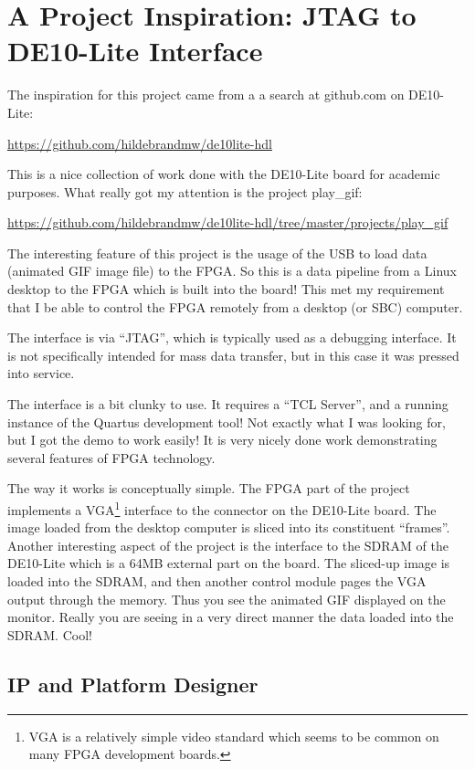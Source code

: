 \section{A Project Inspiration: JTAG to DE10-Lite Interface}

The inspiration for this project came from a a search at github.com on DE10-Lite:

\url{https://github.com/hildebrandmw/de10lite-hdl}

This is a nice collection of work done with the DE10-Lite board for academic purposes.
What really got my attention is the project play\_gif:

\url{https://github.com/hildebrandmw/de10lite-hdl/tree/master/projects/play_gif}

The interesting feature of this project is the usage of the USB to load data (animated GIF image file)
to the FPGA.  So this is a data pipeline from a Linux desktop to the FPGA which is built into the board!
This met my requirement that I be able to control the FPGA remotely from a desktop (or SBC) computer.

The interface is via ``JTAG'', which is typically used as a debugging interface.  It is not specifically intended for mass data transfer, but in this case it was pressed into service.

The interface is a bit clunky to use.  It requires a ``TCL Server'', and a running instance of the Quartus development tool!  Not exactly what I was looking for, but I got the demo to work easily!  It is very nicely done work demonstrating several features of FPGA technology.

The way it works is conceptually simple.  The FPGA part of the project implements a VGA\footnote{VGA is a relatively simple video standard which seems to be common on many FPGA development boards.} interface to the connector on the DE10-Lite board.  The image loaded from the desktop computer is sliced into its constituent ``frames''.
Another interesting aspect of the project is the interface to the SDRAM of the DE10-Lite which is a 64MB external part on the board.  The sliced-up image is loaded into the SDRAM, and then another control module pages the VGA output through the memory.  Thus you see the animated GIF displayed on the monitor.  Really you are seeing in a very direct manner the data loaded into the SDRAM.  Cool!

\subsection{IP and Platform Designer}

